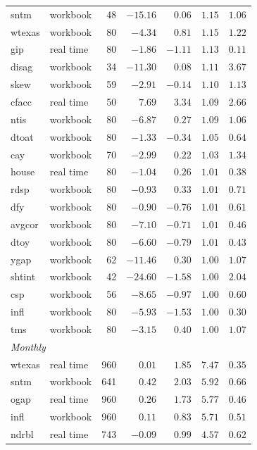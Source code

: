 \begin{tabular}{llrrrrr}
    sntm & workbook & 48 & $-15.16$ & $0.06$ & $1.15$ & $1.06$ \\
    wtexas & workbook & 80 & $-4.34$ & $0.81$ & $1.15$ & $1.22$ \\
    gip & real time & 80 & $-1.86$ & $-1.11$ & $1.13$ & $0.11$ \\
    disag & workbook & 34 & $-11.30$ & $0.08$ & $1.11$ & $3.67$ \\
    skew & workbook & 59 & $-2.91$ & $-0.14$ & $1.10$ & $1.13$ \\
    cfacc & real time & 50 & $7.69$ & $3.34$ & $1.09$ & $2.66$ \\
    ntis & workbook & 80 & $-6.87$ & $0.27$ & $1.09$ & $1.06$ \\
    dtoat & workbook & 80 & $-1.33$ & $-0.34$ & $1.05$ & $0.64$ \\
    cay & workbook & 70 & $-2.99$ & $0.22$ & $1.03$ & $1.34$ \\
    house & real time & 80 & $-1.04$ & $0.26$ & $1.01$ & $0.38$ \\
    rdsp & workbook & 80 & $-0.93$ & $0.33$ & $1.01$ & $0.71$ \\
    dfy & workbook & 80 & $-0.90$ & $-0.76$ & $1.01$ & $0.61$ \\
    avgcor & workbook & 80 & $-7.10$ & $-0.71$ & $1.01$ & $0.46$ \\
    dtoy & workbook & 80 & $-6.60$ & $-0.79$ & $1.01$ & $0.43$ \\
    ygap & workbook & 62 & $-11.46$ & $0.30$ & $1.00$ & $1.07$ \\
    shtint & workbook & 42 & $-24.60$ & $-1.58$ & $1.00$ & $2.04$ \\
    csp & workbook & 56 & $-8.65$ & $-0.97$ & $1.00$ & $0.60$ \\
    infl & workbook & 80 & $-5.93$ & $-1.53$ & $1.00$ & $0.30$ \\
    tms & workbook & 80 & $-3.15$ & $0.40$ & $1.00$ & $1.07$ \\
    \midrule
    \multicolumn{7}{l}{\emph{Monthly}} \\
    wtexas & real time & 960 & $0.01$ & $1.85$ & $7.47$ & $0.35$ \\
    sntm & workbook & 641 & $0.42$ & $2.03$ & $5.92$ & $0.66$ \\
    ogap & real time & 960 & $0.26$ & $1.73$ & $5.77$ & $0.46$ \\
    infl & workbook & 960 & $0.11$ & $0.83$ & $5.71$ & $0.51$ \\
    ndrbl & real time & 743 & $-0.09$ & $0.99$ & $4.57$ & $0.62$ \\

\end{tabular}

